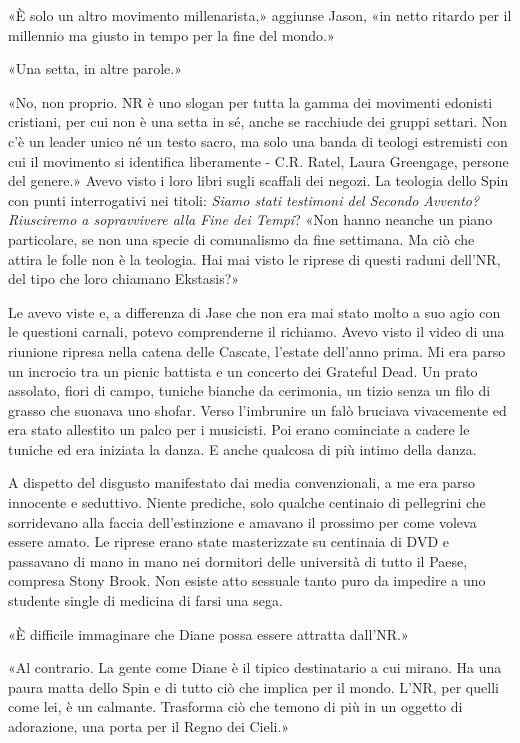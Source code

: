 «È solo un altro movimento millenarista,» aggiunse Jason, «in netto
ritardo per il millennio ma giusto in tempo per la fine del mondo.»

«Una setta, in altre parole.»

«No, non proprio. NR è uno slogan per tutta la gamma dei movimenti
edonisti cristiani, per cui non è una setta in sé, anche se racchiude
dei gruppi settari. Non c'è un leader unico né un testo sacro, ma solo
una banda di teologi estremisti con cui il movimento si identifica
liberamente - C.R. Ratel, Laura Greengage, persone del genere.» Avevo
visto i loro libri sugli scaffali dei negozi. La teologia dello Spin con
punti interrogativi nei titoli: \emph{Siamo stati testimoni del Secondo
	Avvento? Riusciremo a sopravvivere alla Fine dei Tempi}? «Non hanno
neanche un piano particolare, se non una specie di comunalismo da fine
settimana. Ma ciò che attira le folle non è la teologia. Hai mai visto
le riprese di questi raduni dell'NR, del tipo che loro chiamano
Ekstasis?»

Le avevo viste e, a differenza di Jase che non era mai stato molto a suo
agio con le questioni carnali, potevo comprenderne il richiamo. Avevo
visto il video di una riunione ripresa nella catena delle Cascate,
l'estate dell'anno prima. Mi era parso un incrocio tra un picnic
battista e un concerto dei Grateful Dead. Un prato assolato, fiori di
campo, tuniche bianche da cerimonia, un tizio senza un filo di grasso
che suonava uno shofar. Verso l'imbrunire un falò bruciava vivacemente
ed era stato allestito un palco per i musicisti. Poi erano cominciate a
cadere le tuniche ed era iniziata la danza. E anche qualcosa di più
intimo della danza.

A dispetto del disgusto manifestato dai media convenzionali, a me era
parso innocente e seduttivo. Niente prediche, solo qualche centinaio di
pellegrini che sorridevano alla faccia dell'estinzione e amavano il
prossimo per come voleva essere amato. Le riprese erano state
masterizzate su centinaia di DVD e passavano di mano in mano nei
dormitori delle università di tutto il Paese, compresa Stony Brook. Non
esiste atto sessuale tanto puro da impedire a uno studente single di
medicina di farsi una sega.

«È difficile immaginare che Diane possa essere attratta dall'NR.»

«Al contrario. La gente come Diane è il tipico destinatario a cui
mirano. Ha una paura matta dello Spin e di tutto ciò che implica per il
mondo. L'NR, per quelli come lei, è un calmante. Trasforma ciò che
temono di più in un oggetto di adorazione, una porta per il Regno dei
Cieli.»

